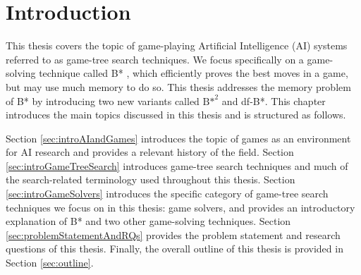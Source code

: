 %
%
%
%
\chapter{Introduction}
This thesis covers the topic of game-playing Artificial Intelligence (AI) systems referred to as game-tree search techniques. We focus specifically on a game-solving technique called B* \cite{Berliner1979}, which efficiently proves the best moves in a game, but may use much memory to do so. This thesis addresses the memory problem of B* by introducing two new variants called ${\text{B*}}^2$ and df-B*. This chapter introduces the main topics discussed in this thesis and is structured as follows.

Section \ref{sec:introAIandGames} introduces the topic of games as an environment for AI research and provides a relevant history of the field. Section \ref{sec:introGameTreeSearch} introduces game-tree search techniques and much of the search-related terminology used throughout this thesis. Section \ref{sec:introGameSolvers} introduces the specific category of game-tree search techniques we focus on in this thesis: game solvers, and provides an introductory explanation of B* and two other game-solving techniques. Section \ref{sec:problemStatementAndRQs} provides the problem statement and research questions of this thesis. Finally, the overall outline of this thesis is provided in Section \ref{sec:outline}.

